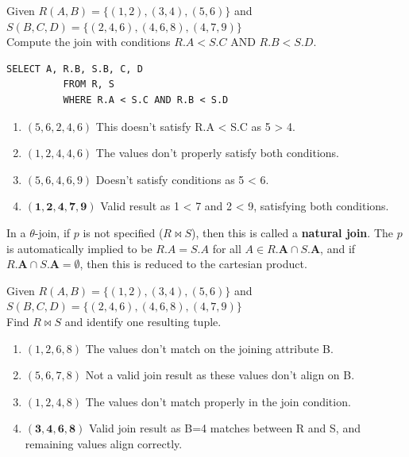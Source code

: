 \documentclass{article}
\begin{document}
      \begin{example}
        Given $R(A,B) = \{(1,2), (3,4), (5,6)\}$ and\\
        $S(B,C,D) = \{(2,4,6), (4,6,8), (4,7,9)\}$\\
        Compute the join with conditions $R.A < S.C$ AND $R.B < S.D$.

        \begin{lstlisting}[basicstyle=\ttfamily]
          SELECT A, R.B, S.B, C, D
          FROM R, S
          WHERE R.A < S.C AND R.B < S.D
        \end{lstlisting}

        \begin{enumerate}
          \item $(5,6,2,4,6)$ This doesn't satisfy R.A < S.C as 5 > 4.
          
          \item $(1,2,4,4,6)$ The values don't properly satisfy both conditions.
          
          \item $(5,6,4,6,9)$ Doesn't satisfy conditions as 5 < 6.
          
          \item $\mathbf{(1,2,4,7,9)}$ Valid result as 1 < 7 and 2 < 9, satisfying both conditions.
        \end{enumerate}
      \end{example}

      \begin{definition}
        In a $\theta$-join, if $p$ is not specified ($R \bowtie S$), then this is called a \textbf{natural join}. The $p$ is automatically implied to be $R.A = S.A$ for all $A \in R.\mathbf{A} \cap S.\mathbf{A}$, and if $R.\mathbf{A} \cap S.\mathbf{A} = \emptyset$, then this is reduced to the cartesian product. 
      \end{definition}

      \begin{example}
        Given $R(A,B) = \{(1,2), (3,4), (5,6)\}$ and\\
        $S(B,C,D) = \{(2,4,6), (4,6,8), (4,7,9)\}$\\
        Find $R \bowtie S$ and identify one resulting tuple.

        \begin{enumerate}
          \item $(1,2,6,8)$ The values don't match on the joining attribute B.
          
          \item $(5,6,7,8)$ Not a valid join result as these values don't align on B.
          
          \item $(1,2,4,8)$ The values don't match properly in the join condition.
          
          \item $\mathbf{(3,4,6,8)}$ Valid join result as B=4 matches between R and S, and remaining values align correctly.
        \end{enumerate}
      \end{example}
\end{document}
